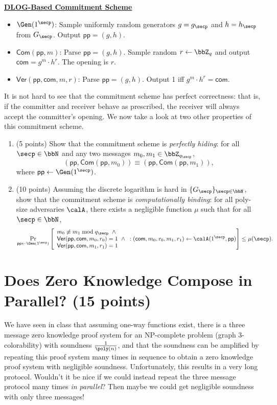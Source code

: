 \documentclass{article}
\newcommand{\proto}[2]{
    \stepcounter{figure}
    \vspace{0.05cm}
    { \small
    \begin{tcolorbox}[breakable]
        \begin{center}
            {\bf \underline{#1}}
        \end{center}
        #2
    \end{tcolorbox} }
}
\newcommand{\pp}{\mathsf{pp}}
\newcommand{\com}{\mathsf{com}}
\newcommand{\Com}{\mathsf{Com}}
\newcommand{\Ver}{\mathsf{Ver}}
\begin{document}
\proto{DLOG-Based Commitment Scheme}{
    \begin{itemize}
        \item $\Gen(1^{\secp})$: Sample uniformly random generators $g = g_{\secp}$ and $h = h_{\secp}$ from $G_{\secp}$. Output $\pp = (g, h)$.
        \item $\Com(\pp, m)$: Parse $\pp = (g, h)$. Sample random $r \gets \bbZ_q$ and output $\com = g^m \cdot h^r$. The opening is $r$.
        \item $\Ver(\pp, \com, m, r)$: Parse $\pp = (g, h)$. Output 1 iff $g^m \cdot h^r = \com$.
    \end{itemize}
}
It is not hard to see that the commitment scheme has perfect correctness: that is, if the committer and receiver behave as prescribed, the receiver will always accept the committer's opening. We now take a look at two other properties of this commitment scheme.
\begin{enumerate}
    \item (5 points) Show that the commitment scheme is \emph{perfectly hiding}: for all $\secp \in \bbN$ and any two messages $m_0, m_1 \in \bbZ_{q_{\secp}}$,
        \[ (\pp, \Com(\pp, m_0)) \equiv (\pp, \Com(\pp, m_1)), \]
    where $\pp \gets \Gen(1^{\secp})$.
    \item (10 points) Assuming the discrete logarithm is hard in $\{G_{\secp}\}_{\secp \in \bbN}$, show that the commitment scheme is \emph{computationally binding}: for all poly-size adversaries $\calA$, there exists a negligible function $\mu$ such that for all $\secp \in \bbN$,
        \[ \Pr_{\pp \gets \Gen(1^{\secp})}\left[\begin{array}{l}
             m_0 \not\equiv m_1 \bmod{q_{\secp}} \hspace{0.2cm} \land \\
             \Ver(\pp, \com, m_0, r_0) = 1 \hspace{0.2cm} \land \\
             \Ver(\pp, \com, m_1, r_1) = 1
        \end{array}: (\com, m_0, r_0, m_1, r_1) \gets \calA(1^{\secp}, \pp)\right] \leq \mu(\secp). \]
\end{enumerate}
\newpage
\newcommand{\mode}{\mathsf{mode}}
\section{Does Zero Knowledge Compose in Parallel? (15 points)}
We have seen in class that assuming one-way functions exist, there is a three message zero knowledge proof system for an NP-complete problem (graph 3-colorability) with soundness $\frac 1 {\poly(n)}$, and that the soundness can be amplified by repeating this proof system many times in sequence to obtain a zero knowledge proof system with negligible soundness. Unfortunately, this results in a very long protocol. Wouldn't it be nice if we could instead repeat the three message protocol many times \emph{in parallel}? Then maybe we could get negligible soundness with only three messages!
\end{document}
